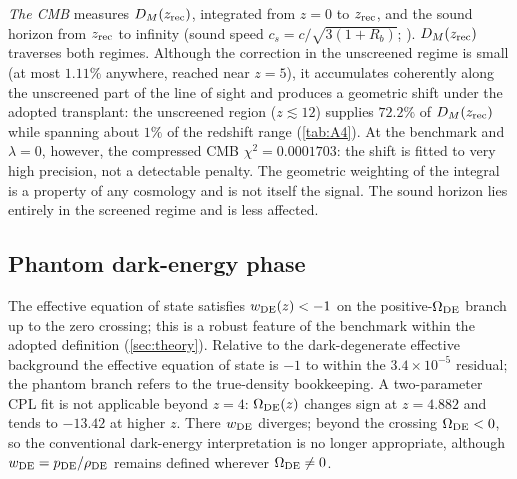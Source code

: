 \emph{The CMB} measures $D_M(z_{\rm rec})$, integrated from $z=0$ to $z_{\rm rec}$, and the sound horizon from $z_{\rm rec}$ to infinity (sound speed $c_s=c/\sqrt{3(1+R_b)}$; \citealp{HuSugiyama1995}). $D_M(z_{\rm rec})$ traverses both regimes. Although the correction in the unscreened regime is small (at most $1.11\%$ anywhere, reached near $z=5$), it accumulates coherently along the unscreened part of the line of sight and produces a geometric shift under the adopted transplant: the unscreened region ($z\lesssim12$) supplies $72.2\%$ of $D_M(z_{\rm rec})$ while spanning about $1\%$ of the redshift range (\cref{tab:A4}). At the benchmark and $\lambda=0$, however, the compressed CMB $\chi^2=0.0001703$: the shift is fitted to very high precision, not a detectable penalty. The geometric weighting of the integral is a property of any cosmology and is not itself the signal. The sound horizon lies entirely in the screened regime and is less affected.

\subsection{Phantom dark-energy phase}
The effective equation of state satisfies $w_{\rm DE}(z)<-1$ on the positive-$\Omega_{\mathrm{DE}}$ branch up to the zero crossing; this is a robust feature of the benchmark within the adopted definition (\cref{sec:theory}). Relative to the dark-degenerate effective background the effective equation of state is $-1$ to within the $3.4\times10^{-5}$ residual; the phantom branch refers to the true-density bookkeeping. A two-parameter CPL fit is not applicable beyond $z=4$: $\Omega_{\mathrm{DE}}(z)$ changes sign at $z=4.882$ and tends to $-13.42$ at higher $z$. There $w_{\rm DE}$ diverges; beyond the crossing $\Omega_{\mathrm{DE}}<0$, so the conventional dark-energy interpretation is no longer appropriate, although $w_{\rm DE}=p_{\rm DE}/\rho_{\rm DE}$ remains defined wherever $\Omega_{\mathrm{DE}}\neq0$.

